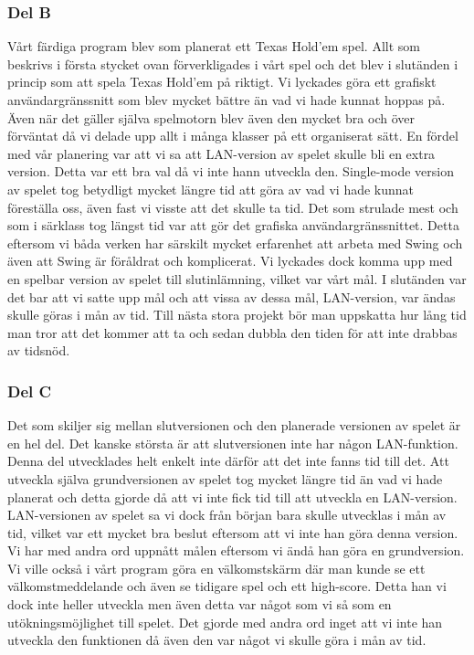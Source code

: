 \documentclass[10pt,a4paper]{article}
\begin{document}
\subsubsection*{Del B}

Vårt färdiga program blev som planerat ett Texas Hold’em spel. Allt som beskrivs i första stycket ovan förverkligades i vårt spel och det blev i slutänden i princip som att spela Texas Hold’em på riktigt. Vi lyckades göra ett grafiskt användargränssnitt som blev mycket bättre än vad vi hade kunnat hoppas på. Även när det gäller själva spelmotorn blev även den mycket bra och över förväntat då vi delade upp allt i många klasser på ett organiserat sätt.
En fördel med vår planering var att vi sa att LAN-version av spelet skulle bli en extra version. Detta var ett bra val då vi inte hann utveckla den. Single-mode version av spelet tog betydligt mycket längre tid att göra av vad vi hade kunnat föreställa oss, även fast vi visste att det skulle ta tid. Det som strulade mest och som i särklass tog längst tid var att gör det grafiska användargränssnittet. Detta eftersom vi båda verken har särskilt mycket erfarenhet att arbeta med Swing och även att Swing är föråldrat och komplicerat. Vi lyckades dock komma upp med en spelbar version av spelet till slutinlämning, vilket var vårt mål. I slutänden var det bar att vi satte upp mål och att vissa av dessa mål, LAN-version, var ändas skulle göras i mån av tid. Till nästa stora projekt bör man uppskatta hur lång tid man tror att det kommer att ta och sedan dubbla den tiden för att inte drabbas av tidsnöd.

\subsubsection*{Del C}

Det som skiljer sig mellan slutversionen och den planerade versionen av spelet är en hel del. Det kanske största är att slutversionen inte har någon LAN-funktion. Denna del utvecklades helt enkelt inte därför att det inte fanns tid till det. Att utveckla själva grundversionen av spelet tog mycket längre tid än vad vi hade planerat och detta gjorde då att vi inte fick tid till att utveckla en LAN-version. LAN-versionen av spelet sa vi dock från början bara skulle utvecklas i mån av tid, vilket var ett mycket bra beslut eftersom att vi inte han göra denna version. Vi har med andra ord uppnått målen eftersom vi ändå han göra en grundversion. Vi ville också i vårt program göra en välkomstskärm där man kunde se ett välkomstmeddelande och även se tidigare spel och ett high-score. Detta han vi dock inte heller utveckla men även detta var något som vi så som en utökningsmöjlighet till spelet. Det gjorde med andra ord inget att vi inte han utveckla den funktionen då även den var något vi skulle göra i mån av tid.
\end{document}
